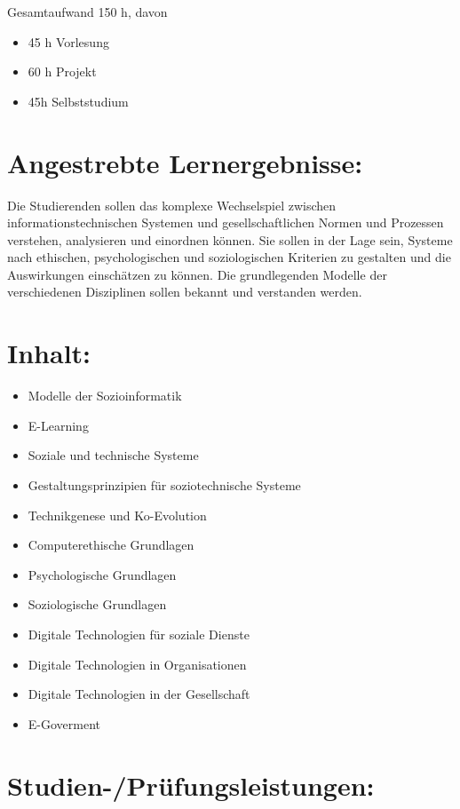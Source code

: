 Gesamtaufwand 150 h, davon

\begin{itemize}
\item
  45 h Vorlesung
\item
  60 h Projekt
\item
  45h Selbststudium
\end{itemize}

\section*{Angestrebte
Lernergebnisse:}\label{angestrebte-lernergebnisse-24}

Die Studierenden sollen das komplexe Wechselspiel zwischen
informationstechnischen Systemen und gesellschaftlichen Normen und
Prozessen verstehen, analysieren und einordnen können. Sie sollen in der
Lage sein, Systeme nach ethischen, psychologischen und soziologischen
Kriterien zu gestalten und die Auswirkungen einschätzen zu können. Die
grundlegenden Modelle der verschiedenen Disziplinen sollen bekannt und
verstanden werden.

\section*{Inhalt:}\label{inhalt-24}

\begin{itemize}
\item
  Modelle der Sozioinformatik
\item
  E-Learning
\item
  Soziale und technische Systeme
\item
  Gestaltungsprinzipien für soziotechnische Systeme
\item
  Technikgenese und Ko-Evolution
\item
  Computerethische Grundlagen
\item
  Psychologische Grundlagen
\item
  Soziologische Grundlagen
\item
  Digitale Technologien für soziale Dienste
\item
  Digitale Technologien in Organisationen
\item
  Digitale Technologien in der Gesellschaft
\item
  E-Goverment
\end{itemize}

\section*{Studien-/Prüfungsleistungen:}\label{studien-pruxfcfungsleistungen-19}

